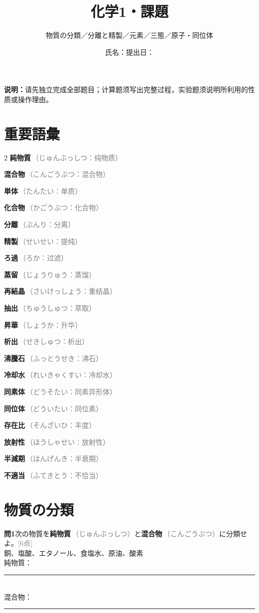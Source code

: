\documentclass[11pt,a4paper]{ctexart}
\title{\color{JapanBlue}\bfseries 化学1・課題}
\author{物質の分類／分離と精製／元素／三態／原子・同位体}
\date{氏名：\blank{45mm}\qquad 提出日：\blank{28mm}}
\newcommand{\vocab}[2]{\textcolor{JapanBlue}{\textbf{#1}}\,\textcolor{gray}{\footnotesize（#2）}}
\newcommand{\blank}[1]{\rule{#1}{0.4pt}}
\newcommand{\score}[1]{\hfill\textcolor{gray}{[#1点]}}
\newenvironment{qbox}{\begin{list}{}{\setlength{\leftmargin}{0pt}}\item\begin{minipage}{\linewidth}}{\end{minipage}\end{list}\vspace{3mm}}
\begin{document}
\maketitle
\begin{center}\colorbox{SoftBlue}{\parbox{.9\linewidth}{\textbf{说明：}请先独立完成全部题目；计算题须写出完整过程，实验题须说明所利用的性质或操作理由。}}\end{center}

\section*{重要語彙}
\small
\begin{multicols}{2}
\vocab{純物質}{じゅんぶっしつ：纯物质}\par
\vocab{混合物}{こんごうぶつ：混合物}\par
\vocab{単体}{たんたい：单质}\par
\vocab{化合物}{かごうぶつ：化合物}\par
\vocab{分離}{ぶんり：分离}\par
\vocab{精製}{せいせい：提纯}\par
\vocab{ろ過}{ろか：过滤}\par
\vocab{蒸留}{じょうりゅう：蒸馏}\par
\vocab{再結晶}{さいけっしょう：重结晶}\par
\vocab{抽出}{ちゅうしゅつ：萃取}\par
\vocab{昇華}{しょうか：升华}\par
\vocab{析出}{せきしゅつ：析出}\par
\vocab{沸騰石}{ふっとうせき：沸石}\par
\vocab{冷却水}{れいきゃくすい：冷却水}\par
\vocab{同素体}{どうそたい：同素异形体}\par
\vocab{同位体}{どういたい：同位素}\par
\vocab{存在比}{そんざいひ：丰度}\par
\vocab{放射性}{ほうしゃせい：放射性}\par
\vocab{半減期}{はんげんき：半衰期}\par
\vocab{不適当}{ふてきとう：不恰当}\par
\end{multicols}

\section{物質の分類}
\begin{qbox}\textbf{問1}\quad 次の物質を\vocab{純物質}{じゅんぶっしつ}と\vocab{混合物}{こんごうぶつ}に分類せよ。\score{6}\\
銅、塩酸、エタノール、食塩水、原油、酸素\\[2mm]
純物質：\blank{95mm}\\[2mm]混合物：\blank{95mm}\end{qbox}
\end{document}
